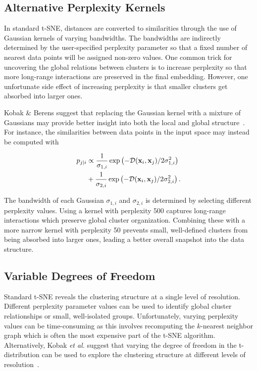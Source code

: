 \documentclass[twocolumn]{bmcart}
\begin{document}
\subsection*{Alternative Perplexity Kernels}

In standard t-SNE, distances are converted to similarities through the use of
Gaussian kernels of varying bandwidths. The bandwidths are indirectly
determined by the user-specified perplexity parameter so that a fixed number of
nearest data points will be assigned non-zero values. One common trick for
uncovering the global relations between clusters is to increase perplexity so
that more long-range interactions are preserved in the final embedding.
However, one unfortunate side effect of increasing perplexity is that smaller
clusters get absorbed into larger ones.

Kobak \& Berens suggest that replacing the Gaussian kernel
with a mixture of Gaussians may provide better insight into both the local and
global structure~\cite{kobak2019art}. For instance, the similarities between data points in the input
space may instead be computed with

\begin{align}
  p_{j\mid i} &\propto \frac{1}{\sigma_{1,i}} \exp \left ( -\mathcal{D}(\mathbf{x}_i, \mathbf{x}_j ) / 2\sigma_{1,i}^2 \right ) \notag \\
  &+ \frac{1}{\sigma_{2,i}} \exp \left ( -\mathcal{D}(\mathbf{x}_i, \mathbf{x}_j ) / 2\sigma_{2,i}^2 \right ).
\end{align}

The bandwidth of each Gaussian $\sigma_{1,i}$ and $\sigma_{2,i}$ is determined
by selecting different perplexity values. Using a kernel with
perplexity 500 captures long-range interactions which preserve global
cluster organization. Combining these with a more narrow kernel with
perplexity 50 prevents small, well-defined clusters from being absorbed
into larger ones, leading a better overall snapshot into the data structure.

\subsection*{Variable Degrees of Freedom}

Standard t-SNE reveals the clustering structure at a single level of
resolution. Different perplexity parameter values can be used to identify
global cluster relationships or small, well-isolated groups. Unfortunately,
varying perplexity values can be time-consuming as this involves recomputing
the $k$-nearest neighbor graph which is often the most expensive part of the t-SNE algorithm.
Alternatively, Kobak \textit{et al.} suggest that varying
the degree of freedom in the t-distribution can be used to explore the clustering structure at different
levels of resolution~\cite{kobak2019heavy}. 
\end{document}
